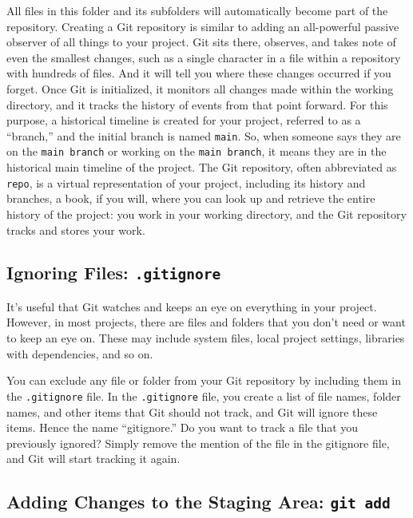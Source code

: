 \documentclass[
  letterpaper,
  DIV=11,
  numbers=noendperiod]{scrreprt}
\begin{document}
All files in this folder and its subfolders will automatically become
part of the repository. Creating a Git repository is similar to adding
an all-powerful passive observer of all things to your project. Git sits
there, observes, and takes note of even the smallest changes, such as a
single character in a file within a repository with hundreds of files.
And it will tell you where these changes occurred if you forget. Once
Git is initialized, it monitors all changes made within the working
directory, and it tracks the history of events from that point forward.
For this purpose, a historical timeline is created for your project,
referred to as a ``branch,'' and the initial branch is named
\texttt{main}. So, when someone says they are on the
\texttt{main\ branch} or working on the \texttt{main\ branch}, it means
they are in the historical main timeline of the project. The Git
repository, often abbreviated as \texttt{repo}, is a virtual
representation of your project, including its history and branches, a
book, if you will, where you can look up and retrieve the entire history
of the project: you work in your working directory, and the Git
repository tracks and stores your work.

\subsection{\texorpdfstring{Ignoring Files:
\texttt{.gitignore}}{Ignoring Files: .gitignore}}\label{ignoring-files-.gitignore}

It's useful that Git watches and keeps an eye on everything in your
project. However, in most projects, there are files and folders that you
don't need or want to keep an eye on. These may include system files,
local project settings, libraries with dependencies, and so on.

You can exclude any file or folder from your Git repository by including
them in the \texttt{.gitignore} file. In the \texttt{.gitignore} file,
you create a list of file names, folder names, and other items that Git
should not track, and Git will ignore these items. Hence the name
``gitignore.'' Do you want to track a file that you previously ignored?
Simply remove the mention of the file in the gitignore file, and Git
will start tracking it again.

\subsection{\texorpdfstring{Adding Changes to the Staging Area:
\texttt{git\ add}}{Adding Changes to the Staging Area: git add}}\label{adding-changes-to-the-staging-area-git-add}
\end{document}
